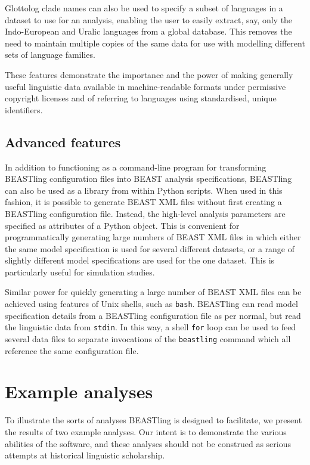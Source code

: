 \documentclass[twocolumn,10pt]{scrartcl}
\begin{document}
Glottolog clade names can also be used to specify a subset of languages in a dataset to use for an analysis, enabling the user to easily extract, say, only the Indo-European and Uralic languages from a global database.  This removes the need to maintain multiple copies of the same data for use with modelling different sets of language families.

These features demonstrate the importance and the power of making generally useful linguistic data available in machine-readable formats under permissive copyright licenses and of referring to languages using standardised, unique identifiers.

\subsection{Advanced features}

In addition to functioning as a command-line program for transforming BEASTling configuration files into BEAST analysis specifications, BEASTling can also be used as a library from within Python scripts.  When used in this fashion, it is possible to generate BEAST XML files without first creating a BEASTling configuration file.  Instead, the high-level analysis parameters are specified as attributes of a Python object.  This is convenient for programmatically generating large numbers of BEAST XML files in which either the same model specification is used for several different datasets, or a range of slightly different model specifications are used for the one dataset.  This is particularly useful for simulation studies.

Similar power for quickly generating a large number of BEAST XML files can be achieved using features of Unix shells, such as \texttt{bash}.  BEASTling can read model specification details from a BEASTling configuration file as per normal, but read the linguistic data from \texttt{stdin}.  In this way, a shell \texttt{for} loop can be used to feed several data files to separate invocations of the \texttt{beastling} command which all reference the same configuration file.

\section{Example analyses}

To illustrate the sorts of analyses BEASTling is designed to facilitate, we present the results of two example analyses.  Our intent is to demonstrate the various abilities of the software, and these analyses should not be construed as serious attempts at historical linguistic scholarship.
\end{document}
